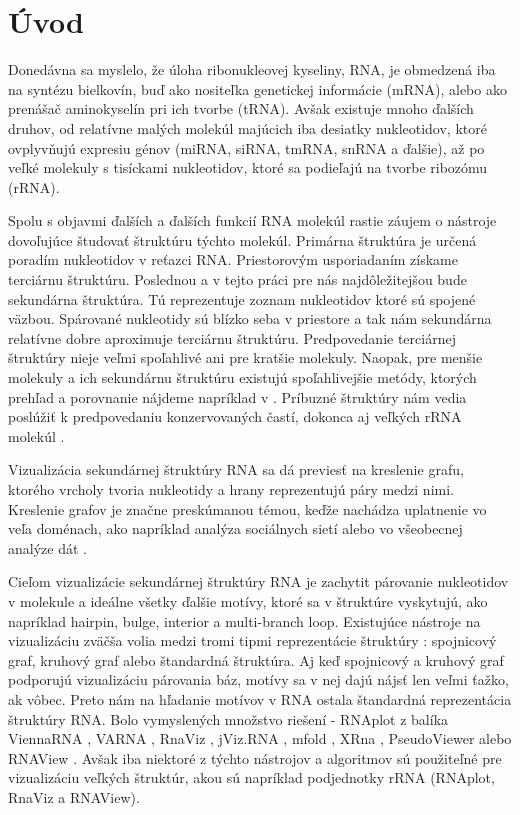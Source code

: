 
\chapter*{Úvod}

Donedávna sa myslelo, že úloha ribonukleovej kyseliny, RNA, je obmedzená
iba na syntézu bielkovín, buď ako nositeľka genetickej informácie (mRNA),
alebo ako prenášač aminokyselín pri ich tvorbe (tRNA).
Avšak existuje mnoho ďalších druhov, od relatívne malých molekúl majúcich
iba desiatky nukleotidov, ktoré ovplyvňujú expresiu génov (miRNA, siRNA, tmRNA, snRNA a ďalšie),
až po veľké molekuly s tisíckami nukleotidov, ktoré sa podieľajú na tvorbe ribozómu (rRNA).

Spolu s objavmi ďalších a ďalších funkcií RNA molekúl rastie záujem o nástroje dovoľujúce
študovať štruktúru týchto molekúl.
Primárna štruktúra je určená poradím nukleotidov v reťazci RNA. Priestorovým usporiadaním
získame terciárnu štruktúru. Poslednou a v tejto práci pre nás najdôležitejšou
bude sekundárna štruktúra. Tú reprezentuje zoznam nukleotidov ktoré sú spojené väzbou.
Spárované nukleotidy sú blízko seba v priestore a tak nám sekundárna relatívne
dobre aproximuje terciárnu štruktúru. Predpovedanie terciárnej štruktúry nieje veľmi
spoľahlivé ani pre kratšie molekuly. Naopak, pre menšie molekuly a ich  sekundárnu
štruktúru existujú spoľahlivejšie metódy, ktorých prehľad a porovnanie nájdeme napríklad
v .
Príbuzné štruktúry nám vedia poslúžiť k predpovedaniu konzervovaných častí, dokonca
aj veľkých rRNA molekúl .

Vizualizácia sekundárnej štruktúry RNA sa dá previesť na kreslenie grafu,
ktorého vrcholy tvoria nukleotidy a hrany reprezentujú páry medzi nimi.
Kreslenie grafov je značne preskúmanou témou, keďže nachádza uplatnenie vo veľa
doménach, ako napríklad analýza sociálnych sietí 
alebo vo všeobecnej analýze dát .

Cieľom vizualizácie sekundárnej štruktúry RNA je zachytit párovanie nukleotidov
v molekule a ideálne všetky ďalšie motívy, ktoré sa v štruktúre vyskytujú,
ako napríklad hairpin, bulge, interior a multi-branch loop.
Existujúce nástroje na vizualizáciu zväčša volia medzi tromi tipmi reprezentácie
štruktúry : spojnicový graf, kruhový graf alebo štandardná štruktúra.
Aj keď spojnicový a kruhový graf podporujú vizualizáciu párovania báz, motívy
sa v nej dajú nájsť len veľmi ťažko, ak vôbec.
Preto nám na hľadanie motívov v RNA ostala štandardná reprezentácia štruktúry RNA.
Bolo vymyslených množstvo riešení -
RNAplot z balíka ViennaRNA , VARNA ,
RnaViz , jViz.RNA , mfold ,
XRna , PseudoViewer  alebo
RNAView .
Avšak iba niektoré z týchto nástrojov a algoritmov sú použiteľné pre vizualizáciu
veľkých štruktúr, akou sú napríklad podjednotky rRNA (RNAplot, RnaViz a RNAView).

